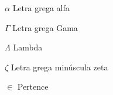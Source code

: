 
\begin{simbolos}
  \item[$ \alpha $] Letra grega alfa
  \item[$ \Gamma $] Letra grega Gama
  \item[$ \Lambda $] Lambda
  \item[$ \zeta $] Letra grega minúscula zeta
  \item[$ \in $] Pertence
\end{simbolos}
